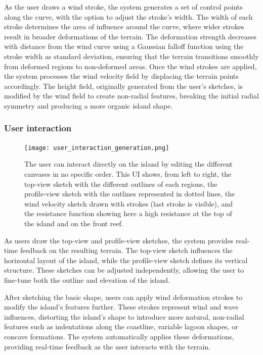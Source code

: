 As the user draws a wind stroke, the system generates a set of control points along the curve, with the option to adjust the stroke's width. The width of each stroke determines the area of influence around the curve, where wider strokes result in broader deformations of the terrain.
The deformation strength decreases with distance from the wind curve using a Gaussian falloff function using the stroke width as standard deviation, ensuring that the terrain transitions smoothly from deformed regions to non-deformed areas.
Once the wind strokes are applied, the system processes the wind velocity field by displacing the terrain points accordingly. The height field, originally generated from the user's sketches, is modified by the wind field to create non-radial features, breaking the initial radial symmetry and producing a more organic island shape.

\subsubsection{User interaction}

\begin{figure}[H]
    \centering
    \texttt{[image: user\_interaction\_generation.png]}
    \caption{The user can interact directly on the island by editing the different canvases in no specific order. This UI shows, from left to right, the top-view sketch with the different outlines of each regions, the profile-view sketch with the outlines represented in dotted lines, the wind velocity sketch drawn with strokes (last stroke is visible), and the resistance function showing here a high resistance at the top of the island and on the front reef.}
    \label{fig:coral-island-wind-from-strokes-interaction}
\end{figure}

As users draw the top-view and profile-view sketches, the system provides real-time feedback on the resulting terrain. The top-view sketch influences the horizontal layout of the island, while the profile-view sketch defines its vertical structure. These sketches can be adjusted independently, allowing the user to fine-tune both the outline and elevation of the island.

After sketching the basic shape, users can apply wind deformation strokes to modify the island's features further. These strokes represent wind and wave influences, distorting the island's shape to introduce more natural, non-radial features such as indentations along the coastline, variable lagoon shapes, or concave formations. The system automatically applies these deformations, providing real-time feedback as the user interacts with the terrain.

